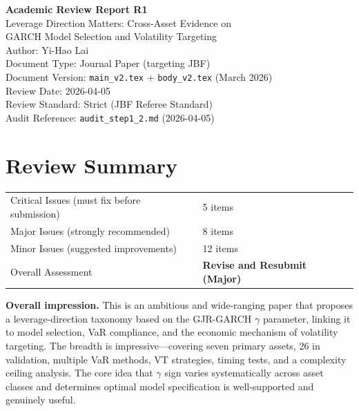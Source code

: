 \documentclass[12pt,a4paper]{article}
\begin{document}
\begin{center}
{\Large\bfseries Academic Review Report R1}\\[0.5em]
{\large Leverage Direction Matters: Cross-Asset Evidence on\\GARCH Model Selection and Volatility Targeting}\\[0.5em]
{\normalsize Author: Yi-Hao Lai}\\[0.3em]
{\normalsize Document Type: Journal Paper (targeting JBF)}\\
{\normalsize Document Version: \texttt{main\_v2.tex} + \texttt{body\_v2.tex} (March 2026)}\\
{\normalsize Review Date: 2026-04-05}\\
{\normalsize Review Standard: Strict (JBF Referee Standard)}\\
{\normalsize Audit Reference: \texttt{audit\_step1\_2.md} (2026-04-05)}
\end{center}

\bigskip

\section*{Review Summary}

\begin{tabular}{ll}
\textcolor{errorred}{Critical Issues (must fix before submission)} & 5 items \\
\textcolor{warncolor}{Major Issues (strongly recommended)} & 8 items \\
Minor Issues (suggested improvements) & 12 items \\
Overall Assessment & \textbf{Revise and Resubmit (Major)} \\
\end{tabular}

\medskip

\noindent\textbf{Overall impression.} This is an ambitious and wide-ranging paper that proposes a leverage-direction taxonomy based on the GJR-GARCH $\gamma$ parameter, linking it to model selection, VaR compliance, and the economic mechanism of volatility targeting. The breadth is impressive---covering seven primary assets, 26 in validation, multiple VaR methods, VT strategies, timing tests, and a complexity ceiling analysis. The core idea that $\gamma$ sign varies systematically across asset classes and determines optimal model specification is well-supported and genuinely useful.
\end{document}
